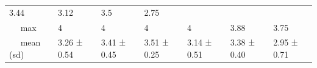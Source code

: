 \documentclass[
  english,
  man,floatsintext]{apa6}
\begin{document}
\begin{longtable}[]{@{}lllllll@{}}
\begin{minipage}[t]{0.11\columnwidth}
3.44\strut
\end{minipage} & \begin{minipage}[t]{0.11\columnwidth}\raggedright
3.12\strut
\end{minipage} & \begin{minipage}[t]{0.11\columnwidth}\raggedright
3.5\strut
\end{minipage} & \begin{minipage}[t]{0.11\columnwidth}\raggedright
2.75\strut
\end{minipage}\tabularnewline
\begin{minipage}[t]{0.16\columnwidth}\raggedright
~~ max\strut
\end{minipage} & \begin{minipage}[t]{0.11\columnwidth}\raggedright
4\strut
\end{minipage} & \begin{minipage}[t]{0.11\columnwidth}\raggedright
4\strut
\end{minipage} & \begin{minipage}[t]{0.11\columnwidth}\raggedright
4\strut
\end{minipage} & \begin{minipage}[t]{0.11\columnwidth}\raggedright
4\strut
\end{minipage} & \begin{minipage}[t]{0.11\columnwidth}\raggedright
3.88\strut
\end{minipage} & \begin{minipage}[t]{0.11\columnwidth}\raggedright
3.75\strut
\end{minipage}\tabularnewline
\begin{minipage}[t]{0.16\columnwidth}\raggedright
~~ mean (sd)\strut
\end{minipage} & \begin{minipage}[t]{0.11\columnwidth}\raggedright
3.26 ± 0.54\strut
\end{minipage} & \begin{minipage}[t]{0.11\columnwidth}\raggedright
3.41 ± 0.45\strut
\end{minipage} & \begin{minipage}[t]{0.11\columnwidth}\raggedright
3.51 ± 0.25\strut
\end{minipage} & \begin{minipage}[t]{0.11\columnwidth}\raggedright
3.14 ± 0.51\strut
\end{minipage} & \begin{minipage}[t]{0.11\columnwidth}\raggedright
3.38 ± 0.40\strut
\end{minipage} & \begin{minipage}[t]{0.11\columnwidth}\raggedright
2.95 ± 0.71\strut
\end{minipage}\tabularnewline
\bottomrule
\end{longtable}
\end{document}
